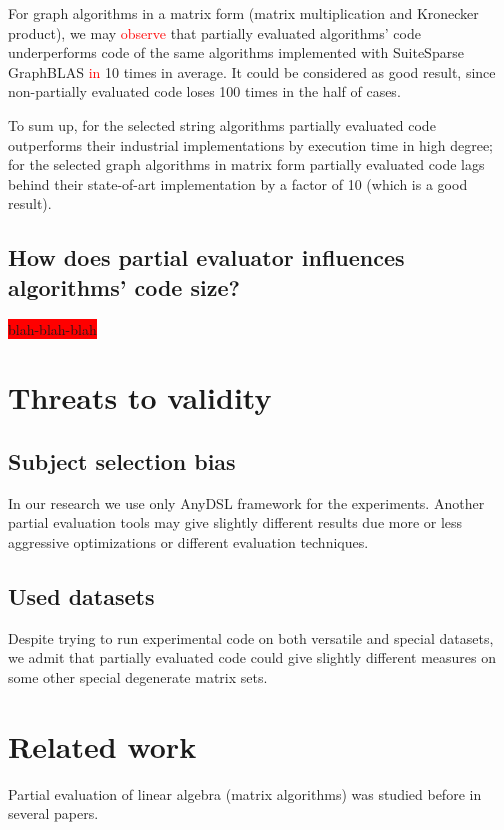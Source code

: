 \documentclass[conference]{IEEEtran}
\begin{document}
For graph algorithms in a matrix form (matrix multiplication and Kronecker product), we may \textcolor{red}{observe} that partially evaluated algorithms' code underperforms code of the same algorithms implemented with SuiteSparse GraphBLAS \textcolor{red}{in} 10 times in average. It could be considered as good result, since non-partially evaluated code loses 100 times in the half of cases.

To sum up, for the selected string algorithms partially evaluated code outperforms their industrial implementations by execution time in high degree; for the selected graph algorithms in matrix form partially evaluated code lags behind their state-of-art implementation by a factor of 10 (which is a good result).


\subsection{How does partial evaluator influences algorithms' code size?}

\colorbox{red}{blah-blah-blah}

\section{Threats to validity}

\subsection{Subject selection bias}
In our research we use only AnyDSL framework for the experiments. Another partial evaluation tools may give slightly different results due more or less aggressive optimizations or different evaluation techniques.

\subsection{Used datasets}
Despite trying to run experimental code on both versatile and special datasets, we admit that partially evaluated code could give slightly different measures on some other special degenerate matrix sets.

\section{Related work}

Partial evaluation of linear algebra (matrix algorithms) was studied before in several papers.
\end{document}
